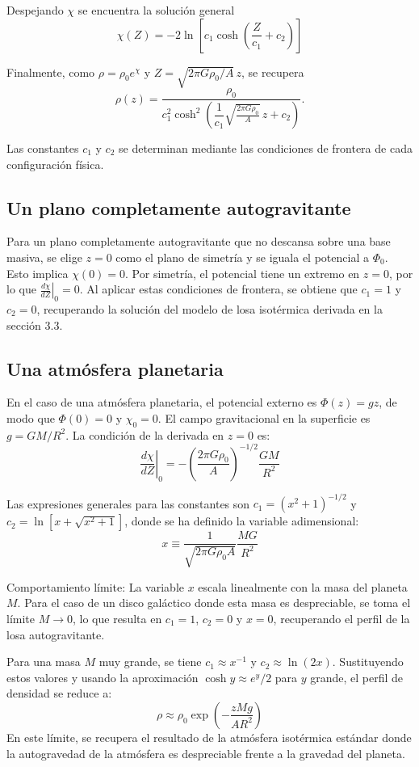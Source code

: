 Despejando $\chi$ se encuentra la solución general
$$ \chi(Z) = -2 \ln\left[ c_1 \cosh\left( \frac{Z}{c_1} + c_2 \right) \right] $$

Finalmente, como $\rho=\rho_0e^\chi$ y
$Z=\sqrt{2\pi G\rho_0/A}\,z$, se recupera
$$
\boxed{
\rho(z)
=\frac{\rho_0}{c_1^2
\cosh^2\left(
\dfrac{1}{c_1}\sqrt{\frac{2\pi G\rho_0}{A}}\,z+c_2
\right)}
}.
$$

Las constantes $c_1$ y $c_2$ se determinan mediante las condiciones de frontera de cada configuración física.

\subsection{Un plano completamente autogravitante}

Para un plano completamente autogravitante que no descansa sobre una base masiva, se elige $z=0$ como el plano de simetría y se iguala el potencial a $\Phi_0$. Esto implica $\chi(0) = 0$. Por simetría, el potencial tiene un extremo en $z=0$, por lo que $\left.\frac{d\chi}{dZ}\right|_0 = 0$. Al aplicar estas condiciones de frontera, se obtiene que $c_1 = 1$ y $c_2 = 0$, recuperando la solución del modelo de losa isotérmica derivada en la sección 3.3.

\subsection{Una atmósfera planetaria}

En el caso de una atmósfera planetaria, el potencial externo es $\Phi(z) = gz$, de modo que $\Phi(0) = 0$ y $\chi_0 = 0$. El campo gravitacional en la superficie es $g = GM/R^2$. La condición de la derivada en $z=0$ es:
$$ \left.\frac{d\chi}{dZ}\right|_0 = -\left(\frac{2\pi G \rho_0}{A}\right)^{-1/2} \frac{GM}{R^2} $$

Las expresiones generales para las constantes son $c_1 = (x^2 + 1)^{-1/2}$ y $c_2 = \ln[x + \sqrt{x^2 + 1}]$, donde se ha definido la variable adimensional:
$$ x \equiv \frac{1}{\sqrt{2\pi G \rho_0 A}} \frac{MG}{R^2} $$

Comportamiento límite:
La variable $x$ escala linealmente con la masa del planeta $M$. Para el caso de un disco galáctico donde esta masa es despreciable, se toma el límite $M \to 0$, lo que resulta en $c_1 = 1$, $c_2 = 0$ y $x = 0$, recuperando el perfil de la losa autogravitante.

Para una masa $M$ muy grande, se tiene $c_1 \approx x^{-1}$ y $c_2 \approx \ln(2x)$. Sustituyendo estos valores y usando la aproximación $\cosh y \approx e^y/2$ para $y$ grande, el perfil de densidad se reduce a:
$$ \rho \approx \rho_0 \exp\left(-\frac{zMg}{AR^2}\right) $$
En este límite, se recupera el resultado de la atmósfera isotérmica estándar donde la autogravedad de la atmósfera es despreciable frente a la gravedad del planeta.

